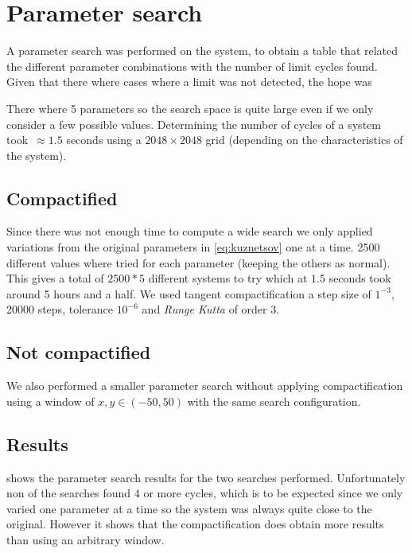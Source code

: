 
\section{Parameter search}%
\label{sec:parameter-search}

A parameter search was performed on the system, to obtain a table that related
the different parameter combinations with the number of limit cycles found.
Given that there where cases where a limit was not detected, the hope was

There where 5 parameters so the search space is quite large even if we only
consider a few possible values. Determining the number of cycles of a system
took~$\approx 1.5$ seconds using a $2048 \times 2048$ grid (depending on the
characteristics of the system).

\subsection{Compactified}

Since there was not enough time to compute a wide search we only applied
variations from the original parameters in \cref{eq:kuznetsov} one at a time.
2500 different values where tried for each parameter (keeping the others as
normal). This gives a total of $2500*5$ different systems to try which at
$1.5$ seconds took around 5 hours and a half. We used tangent compactification
a step size of $1^{-3}$, 20000 steps, tolerance $10^{-6}$ and \emph{Runge Kutta}
of order 3.

\subsection{Not compactified}

We also performed a smaller parameter search without applying compactification
using a window of $x, y \in (-50, 50)$ with the same search configuration.

\pagebreak
\subsection{Results}

 shows the parameter search results for the two searches performed.
Unfortunately non of the searches found 4 or more cycles, which is to be expected since
we only varied one parameter at a time so the system was always quite close to the
original. However it shows that the compactification does obtain more results than
using an arbitrary window.

